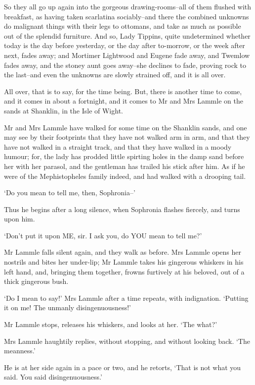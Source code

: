 So they all go up again into the gorgeous drawing-rooms--all of them
flushed with breakfast, as having taken scarlatina sociably--and there
the combined unknowns do malignant things with their legs to ottomans,
and take as much as possible out of the splendid furniture. And so, Lady
Tippins, quite undetermined whether today is the day before yesterday,
or the day after to-morrow, or the week after next, fades away; and
Mortimer Lightwood and Eugene fade away, and Twemlow fades away, and
the stoney aunt goes away--she declines to fade, proving rock to the
last--and even the unknowns are slowly strained off, and it is all over.

All over, that is to say, for the time being. But, there is another time
to come, and it comes in about a fortnight, and it comes to Mr and Mrs
Lammle on the sands at Shanklin, in the Isle of Wight.

Mr and Mrs Lammle have walked for some time on the Shanklin sands, and
one may see by their footprints that they have not walked arm in arm,
and that they have not walked in a straight track, and that they have
walked in a moody humour; for, the lady has prodded little spirting
holes in the damp sand before her with her parasol, and the gentleman
has trailed his stick after him. As if he were of the Mephistopheles
family indeed, and had walked with a drooping tail.

‘Do you mean to tell me, then, Sophronia--’

Thus he begins after a long silence, when Sophronia flashes fiercely,
and turns upon him.

‘Don’t put it upon ME, sir. I ask you, do YOU mean to tell me?’

Mr Lammle falls silent again, and they walk as before. Mrs Lammle opens
her nostrils and bites her under-lip; Mr Lammle takes his gingerous
whiskers in his left hand, and, bringing them together, frowns furtively
at his beloved, out of a thick gingerous bush.

‘Do I mean to say!’ Mrs Lammle after a time repeats, with indignation.
‘Putting it on me! The unmanly disingenuousness!’

Mr Lammle stops, releases his whiskers, and looks at her. ‘The what?’

Mrs Lammle haughtily replies, without stopping, and without looking
back. ‘The meanness.’

He is at her side again in a pace or two, and he retorts, ‘That is not
what you said. You said disingenuousness.’

